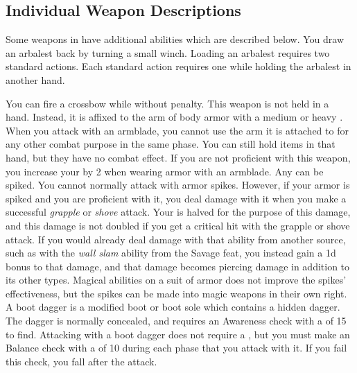    \subsection{Individual Weapon Descriptions}
        Some weapons in  have additional abilities which are described below.
         You draw an arbalest back by turning a small winch. Loading an arbalest requires two standard actions.
        Each standard action requires one  while holding the arbalest in another hand.
        \par You can fire a crossbow while \prone without penalty.
         This weapon is not held in a hand.
        Instead, it is affixed to the arm of body armor with a medium or heavy .
        When you attack with an armblade, you cannot use the arm it is attached to for any other combat purpose in the same phase.
        You can still hold items in that hand, but they have no combat effect.
        If you are not proficient with this weapon, you increase your  by 2 when wearing armor with an armblade.
         Any  can be spiked.
        You cannot normally attack with armor spikes.
        However, if your armor is spiked and you are proficient with it, you deal damage with it when you make a successful \textit{grapple} or \textit{shove} attack.
        Your  is halved for the purpose of this damage, and this damage is not doubled if you get a critical hit with the grapple or shove attack.
        If you would already deal damage with that ability from another source, such as with the \textit{wall slam} ability from the Savage feat, you instead gain a \plus1d bonus to that damage, and that damage becomes piercing damage in addition to its other types.
        Magical abilities on a suit of armor does not improve the spikes' effectiveness, but the spikes can be made into magic weapons in their own right.
         A boot dagger is a modified boot or boot sole which contains a hidden dagger.
        The dagger is normally concealed, and requires an Awareness check with a  of 15 to find.
        Attacking with a boot dagger does not require a , but you must make an Balance check with a  of 10 during each phase that you attack with it.
        If you fail this check, you fall \prone after the attack.

